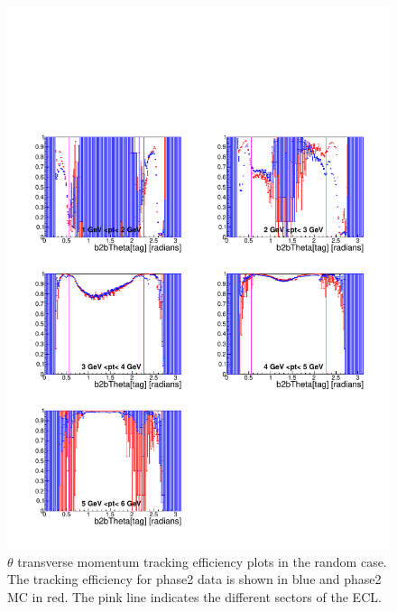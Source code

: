 \documentclass[a4paper,11pt,twosided,final,german,openbib,pdftex,listof=totoc,bibliography=totoc]{scrbook}
\begin{document}
\begin{figure}[!htbp]
	\centering
	\includegraphics[width=\textwidth]{Plots/master/xPtMThetaRandom}
	\caption[Transverse Momentum $\theta$ Random Efficiency Phase2]{$\theta$ transverse momentum tracking efficiency plots in the random case. The tracking efficiency for phase2 data is shown in blue and phase2 MC in red. The pink line indicates the different sectors of the ECL.}
\end{figure}
\end{document}

